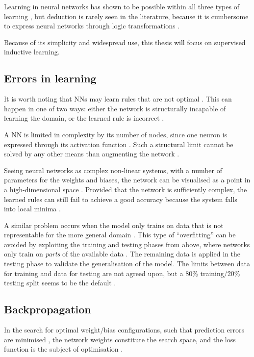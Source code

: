 \documentclass[report.tex]{subfiles}
\begin{document}
Learning in neural networks has shown to be possible within all three
types of learning \cite{Schmidhuber2014, Russel2007}, but deduction is rarely
seen in the literature, because it is cumbersome to express neural
networks through logic transformations \cite{Pearl2018}.

Because of its simplicity and widespread use, this thesis will focus on supervised
inductive learning.

\subsection{Errors in learning}
It is worth noting that \gls{NN}s may learn 
rules  that are not optimal \cite{Russel2007}.
This can happen in one of two ways: either the
network is structurally incapable of learning the domain, 
or the learned rule is incorrect \cite{Russel2007, Eliasmith2015}.

A \gls{NN} is limited in complexity by its number of nodes,
since one neuron is expressed through its activation function
\cite{Dayan2001, Russel2007}.
Such a structural limit cannot be solved by any other means
than augmenting the network \cite{Russel2007}.

Seeing neural networks as complex non-linear systems, with
a number of parameters for the weights and biases,
the network can be visualised as a point in a high-dimensional space 
\cite{Russel2007}. 
Provided that the network is sufficiently complex, the 
learned rules can still fail to achieve a good accuracy because
the system falls into local minima \cite{Russel2007}.

A similar problem occurs when the model only trains on data
that is not representable for the more general domain \cite{Russel2007}.
This type of ``overfitting'' can be avoided by exploiting the 
training and testing phases from above, where networks
only train on \textit{parts} of the available data
\cite{Russel2007, Schmidhuber2014}.
The remaining data is applied in the testing phase to
validate the generalisation of the model.
The limits between data for training and data for testing
are not agreed upon, but a 80\% training/20\% testing split seems to be
the default \cite{Russel2007, Schmidhuber2014}.

\subsection{Backpropagation}
In the search for optimal weight/bias configurations,
such that prediction errors are minimised \cite{Rumelhart1988},
the network weights constitute the search space, 
and the loss function 
is the subject of optimisation \cite{Russel2007}.
\end{document}
